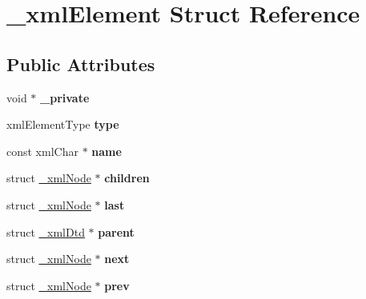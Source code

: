 \hypertarget{struct__xmlElement}{
\section{\_\-xmlElement Struct Reference}
\label{struct__xmlElement}
}
\subsection*{Public Attributes}
\begin{DoxyCompactItemize}
\item 
\hypertarget{struct__xmlElement_a1771412a687f3fa1ab248c62ed486d0b}{
void $\ast$ {\bfseries \_\-private}}
\label{struct__xmlElement_a1771412a687f3fa1ab248c62ed486d0b}

\item 
\hypertarget{struct__xmlElement_ac73d23a5babfe6a4c48154cece65cecb}{
xmlElementType {\bfseries type}}
\label{struct__xmlElement_ac73d23a5babfe6a4c48154cece65cecb}

\item 
\hypertarget{struct__xmlElement_a2aeca065453944e7eeedf8c7622660b9}{
const xmlChar $\ast$ {\bfseries name}}
\label{struct__xmlElement_a2aeca065453944e7eeedf8c7622660b9}

\item 
\hypertarget{struct__xmlElement_a9a61f0ef96d83c54c78fc8c44a3f17df}{
struct \hyperlink{struct__xmlNode}{\_\-xmlNode} $\ast$ {\bfseries children}}
\label{struct__xmlElement_a9a61f0ef96d83c54c78fc8c44a3f17df}

\item 
\hypertarget{struct__xmlElement_abd8e4a7d4c80a883edfd5a694e029b8c}{
struct \hyperlink{struct__xmlNode}{\_\-xmlNode} $\ast$ {\bfseries last}}
\label{struct__xmlElement_abd8e4a7d4c80a883edfd5a694e029b8c}

\item 
\hypertarget{struct__xmlElement_a6e82cf8a8a00afdf1facbe0d95f8c691}{
struct \hyperlink{struct__xmlDtd}{\_\-xmlDtd} $\ast$ {\bfseries parent}}
\label{struct__xmlElement_a6e82cf8a8a00afdf1facbe0d95f8c691}

\item 
\hypertarget{struct__xmlElement_ae8e3606454fe2af6d20c073a1d3045ab}{
struct \hyperlink{struct__xmlNode}{\_\-xmlNode} $\ast$ {\bfseries next}}
\label{struct__xmlElement_ae8e3606454fe2af6d20c073a1d3045ab}

\item 
\hypertarget{struct__xmlElement_a6de172fb1891a78067d27b8680d493a0}{
struct \hyperlink{struct__xmlNode}{\_\-xmlNode} $\ast$ {\bfseries prev}}
\label{struct__xmlElement_a6de172fb1891a78067d27b8680d493a0}


\end{DoxyCompactItemize}
